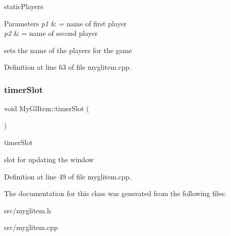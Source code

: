 static\+Players 


\begin{DoxyParams}{Parameters}
{\em p1} & = name of first player \\
\hline
{\em p2} & = name of second player\\
\hline
\end{DoxyParams}
sets the name of the players for the game 

Definition at line 63 of file myglitem.\+cpp.

\mbox{\label{class_my_gl_item_adbaf81ef21b3437d37571fa897594550}} 
\subsubsection{\texorpdfstring{timerSlot}{timerSlot}}
{\footnotesize\ttfamily void My\+Gl\+Item\+::timer\+Slot (\begin{DoxyParamCaption}{ }\end{DoxyParamCaption})\hspace{0.3cm}{\ttfamily [slot]}}



timer\+Slot 

slot for updating the window 

Definition at line 49 of file myglitem.\+cpp.



The documentation for this class was generated from the following files\+:\begin{DoxyCompactItemize}
\item 
src/myglitem.\+h\item 
src/myglitem.\+cpp\end{DoxyCompactItemize}
